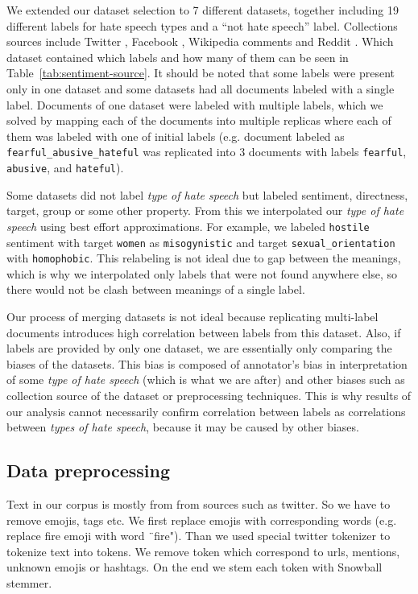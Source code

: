 \documentclass[fleqn,moreauthors,10pt]{ds_report}
\begin{document}
We extended our dataset selection to 7 different datasets, together including 19 different labels for hate speech types and a ``not hate speech'' label. Collections sources include Twitter \cite{20_twitter, 32_twitter, vulgar-twitter, 25_twitter}, Facebook \cite{16_facebook}, Wikipedia comments \cite{kaggle-jigsaw} and Reddit \cite{zenodo}. Which dataset contained which labels and how many of them can be seen in Table~\ref{tab:sentiment-source}.
It should be noted that some labels were present only in one dataset and some datasets had all documents labeled with a single label. Documents of one dataset were labeled with multiple labels, which we solved by mapping each of the documents into multiple replicas where each of them was labeled with one of initial labels (e.g. document labeled as \texttt{fearful\_abusive\_hateful} was replicated into 3 documents with labels \texttt{fearful}, \texttt{abusive}, and \texttt{hateful}).

Some datasets did not label \textit{type of hate speech} but labeled sentiment, directness, target, group or some other property. From this we interpolated our \textit{type of hate speech} using best effort approximations. For example, we labeled \texttt{hostile} sentiment with target \texttt{women} as \texttt{misogynistic} and target \texttt{sexual\_orientation} with \texttt{homophobic}. This relabeling is not ideal due to gap between the meanings, which is why we interpolated only labels that were not found anywhere else, so there would not be clash between meanings of a single label.

Our process of merging datasets is not ideal because replicating multi-label documents introduces high correlation between labels from this dataset. Also, if labels are provided by only one dataset, we are essentially only comparing the biases of the datasets. This bias is composed of annotator's bias in interpretation of some \textit{type of hate speech} (which is what we are after) and other biases such as collection source of the dataset or preprocessing techniques. This is why results of our analysis cannot necessarily confirm correlation between labels as correlations between \textit{types of hate speech}, because it may be caused by other biases.

\subsection*{Data preprocessing}
Text in our corpus is mostly from from sources such as twitter. So we have to remove emojis, tags etc. We first replace emojis with corresponding words (e.g. replace fire emoji with word ¨fire"). Than we used special twitter tokenizer to tokenize text into tokens. We remove token which correspond to urls, mentions, unknown emojis or hashtags. On the end we stem each token with Snowball stemmer.
\end{document}
